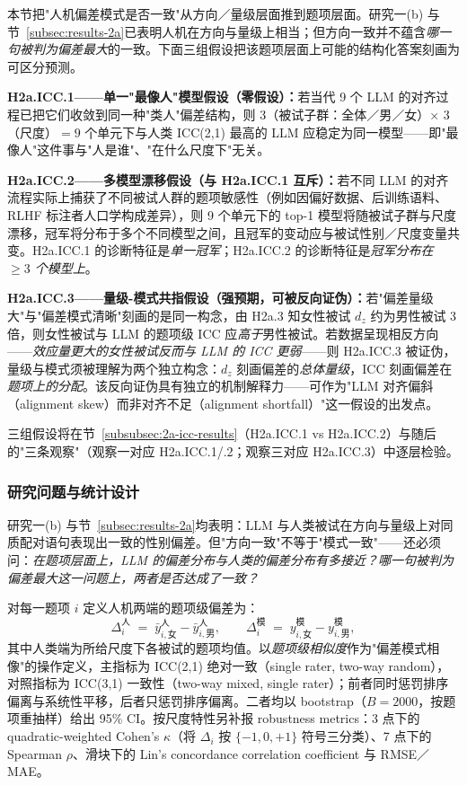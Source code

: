 \documentclass[UTF8,12pt]{ctexart}
\begin{document}
本节把"人机偏差模式是否一致"从方向／量级层面推到题项层面。研究一(b) 与节~\ref{subsec:results-2a}已表明人机在方向与量级上相当；但方向一致并不蕴含\emph{哪一句被判为偏差最大}的一致。下面三组假设把该题项层面上可能的结构化答案刻画为可区分预测。

\textbf{H2a.ICC.1——单一"最像人"模型假设（零假设）：}若当代 9 个 LLM 的对齐过程已把它们收敛到同一种"类人"偏差结构，则 3（被试子群：全体／男／女）$\times$ 3（尺度）$= 9$ 个单元下与人类 ICC(2,1) 最高的 LLM 应稳定为同一模型——即"最像人"这件事与"人是谁"、"在什么尺度下"无关。

\textbf{H2a.ICC.2——多模型漂移假设（与 H2a.ICC.1 互斥）：}若不同 LLM 的对齐流程实际上捕获了不同被试人群的题项敏感性（例如因偏好数据、后训练语料、RLHF 标注者人口学构成差异），则 9 个单元下的 top-1 模型将随被试子群与尺度漂移，冠军将分布于多个不同模型之间，且冠军的变动应与被试性别／尺度变量共变。H2a.ICC.1 的诊断特征是\emph{单一冠军}；H2a.ICC.2 的诊断特征是\emph{冠军分布在 $\geq 3$ 个模型上}。

\textbf{H2a.ICC.3——量级-模式共指假设（强预期，可被反向证伪）：}若"偏差量级大"与"偏差模式清晰"刻画的是同一构念，由 H2a.3 知女性被试 $d_z$ 约为男性被试 3 倍，则女性被试与 LLM 的题项级 ICC 应\emph{高于}男性被试。若数据呈现相反方向——\emph{效应量更大的女性被试反而与 LLM 的 ICC 更弱}——则 H2a.ICC.3 被证伪，量级与模式须被理解为两个独立构念：$d_z$ 刻画偏差的\emph{总体量级}，ICC 刻画偏差在\emph{题项上的分配}。该反向证伪具有独立的机制解释力——可作为"LLM 对齐偏斜（alignment skew）而非对齐不足（alignment shortfall）"这一假设的出发点。

三组假设将在节~\ref{subsubsec:2a-icc-results}（H2a.ICC.1 vs H2a.ICC.2）与随后的"三条观察"（观察一对应 H2a.ICC.1/.2；观察三对应 H2a.ICC.3）中逐层检验。

\subsubsection{研究问题与统计设计}

研究一(b) 与节~\ref{subsec:results-2a}均表明：LLM 与人类被试在方向与量级上对同质配对语句表现出一致的性别偏差。但"方向一致"不等于"模式一致"——还必须问：\emph{在题项层面上，LLM 的偏差分布与人类的偏差分布有多接近？哪一句被判为偏差最大这一问题上，两者是否达成了一致？}

对每一题项 $i$ 定义人机两端的题项级偏差为：
\[
\Delta_i^{\text{人}} \;=\; \bar y_{i,\text{女}}^{\text{人}} - \bar y_{i,\text{男}}^{\text{人}}, \qquad
\Delta_i^{\text{模}} \;=\; y_{i,\text{女}}^{\text{模}} - y_{i,\text{男}}^{\text{模}},
\]
其中人类端为所给尺度下各被试的题项均值。以\emph{题项级相似度}作为"偏差模式相像"的操作定义，主指标为 ICC(2,1) 绝对一致（single rater, two-way random），对照指标为 ICC(3,1) 一致性（two-way mixed, single rater）；前者同时惩罚排序偏离与系统性平移，后者只惩罚排序偏离。二者均以 bootstrap（$B=2000$，按题项重抽样）给出 95\% CI。按尺度特性另补报 robustness metrics：3 点下的 quadratic-weighted Cohen's $\kappa$（将 $\Delta_i$ 按 $\{-1, 0, +1\}$ 符号三分类）、7 点下的 Spearman $\rho$、滑块下的 Lin's concordance correlation coefficient 与 RMSE／MAE。
\end{document}
